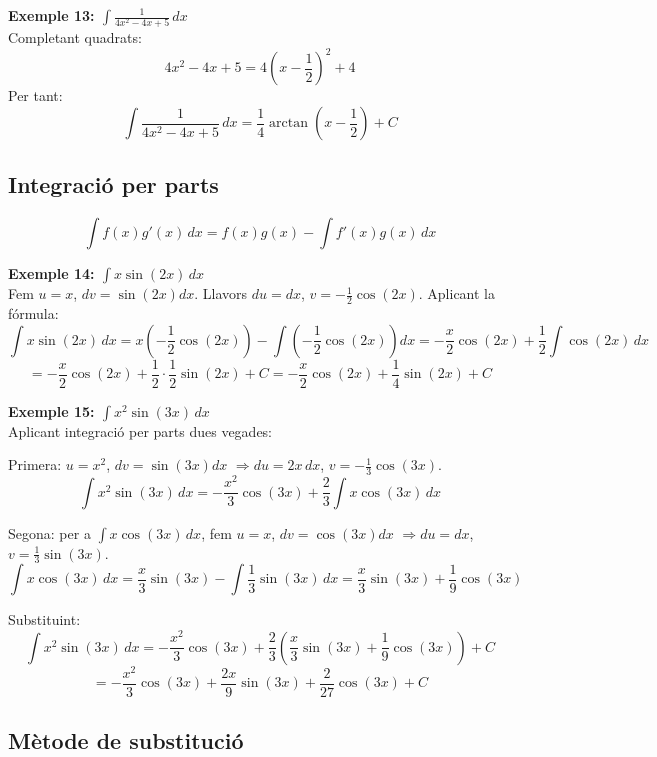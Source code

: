 \documentclass[12pt]{article}
\begin{document}
\begin{exemple}
\textbf{Exemple 13: $\displaystyle \int \frac{1}{4x^2-4x+5}\,dx$}\\
Completant quadrats:
\[
4x^2-4x+5 = 4\left(x-\frac{1}{2}\right)^2 + 4
\]
Per tant:
\[
\int \frac{1}{4x^2-4x+5}\,dx = \frac{1}{4}\arctan\left(x-\frac{1}{2}\right) + C
\]
\end{exemple}

\subsection{Integració per parts}

\begin{concept}
\[
\int f(x)g'(x)\,dx = f(x)g(x) - \int f'(x)g(x)\,dx
\]
\end{concept}

\begin{exemple}
\textbf{Exemple 14: $\displaystyle \int x\sin(2x)\,dx$}\\
Fem $u=x$, $dv=\sin(2x)dx$. Llavors $du=dx$, $v=-\frac{1}{2}\cos(2x)$. Aplicant la fórmula:
\[
\int x\sin(2x)\,dx = x\left(-\frac{1}{2}\cos(2x)\right) - \int \left(-\frac{1}{2}\cos(2x)\right) dx = -\frac{x}{2}\cos(2x) + \frac{1}{2}\int \cos(2x)\,dx
\]
\[
= -\frac{x}{2}\cos(2x) + \frac{1}{2}\cdot\frac{1}{2}\sin(2x) + C = -\frac{x}{2}\cos(2x) + \frac{1}{4}\sin(2x) + C
\]
\end{exemple}

\begin{exemple}
\textbf{Exemple 15: $\displaystyle \int x^2\sin(3x)\,dx$}\\
Aplicant integració per parts dues vegades:

Primera: $u=x^2$, $dv=\sin(3x)dx$ $\Rightarrow du=2x\,dx$, $v=-\frac{1}{3}\cos(3x)$.
\[
\int x^2\sin(3x)\,dx = -\frac{x^2}{3}\cos(3x) + \frac{2}{3}\int x\cos(3x)\,dx
\]

Segona: per a $\int x\cos(3x)\,dx$, fem $u=x$, $dv=\cos(3x)dx$ $\Rightarrow du=dx$, $v=\frac{1}{3}\sin(3x)$.
\[
\int x\cos(3x)\,dx = \frac{x}{3}\sin(3x) - \int \frac{1}{3}\sin(3x)\,dx = \frac{x}{3}\sin(3x) + \frac{1}{9}\cos(3x)
\]

Substituint:
\[
\int x^2\sin(3x)\,dx = -\frac{x^2}{3}\cos(3x) + \frac{2}{3}\left( \frac{x}{3}\sin(3x) + \frac{1}{9}\cos(3x) \right) + C
\]
\[
= -\frac{x^2}{3}\cos(3x) + \frac{2x}{9}\sin(3x) + \frac{2}{27}\cos(3x) + C
\]
\end{exemple}

\subsection{Mètode de substitució}
\end{document}
